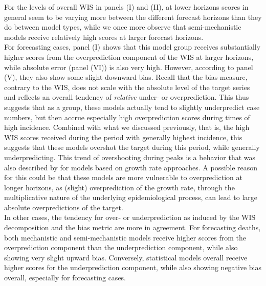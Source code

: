 For the levels of overall WIS in panels (I) and (II), at lower horizons scores in general seem to be varying more between the different forecast horizons than they do between model types, while we once more observe that semi-mechanistic models receive relatively high scores at larger forecast horizons. \\
For forecasting cases, panel (I) shows that this model group receives substantially higher scores from the overprediction component of the WIS at larger horizons, while absolute error (panel (VI)) is also very high. However, according to panel (V), they also show some slight downward bias. Recall that the bias measure, contrary to the WIS, does not scale with the absolute level of the target series and reflects an overall tendency of \textit{relative} under- or overprediction. This thus suggests that as a group, these models actually tend to slightly underpredict case numbers, but then accrue especially high overprediction scores during times of high incidence. Combined with what we discussed previously, that is, the high WIS scores received during the period with generally highest incidence, this suggests that these models overshot the target during this period, while generally underpredicting. This trend of overshooting during peaks is a behavior that was also described by \cite{bracher_evaluating_2021} for models based on growth rate approaches. A possible reason for this could be that these models are more vulnerable to overprediction at longer horizons, as (slight) overprediction of the growth rate, through the multiplicative nature of the underlying epidemiological process, can lead to large absolute overpredictions of the target.\\
In other cases, the tendency for over- or underprediction as induced by the WIS decomposition and the bias metric are more in agreement. For forecasting deaths, both mechanistic and semi-mechanistic models receive higher scores from the overprediction component than the underprediction component, while also showing very slight upward bias. Conversely, statistical models overall receive higher scores for the underprediction component, while also showing negative bias overall, especially for forecasting cases. \\
